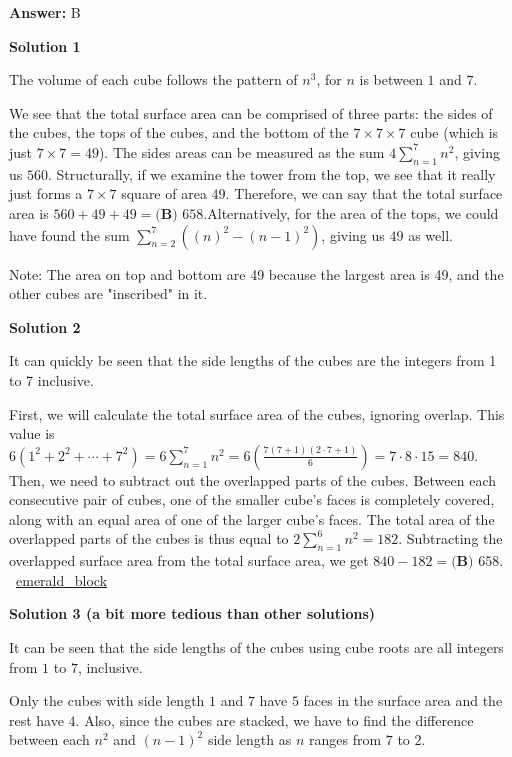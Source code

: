\begin{enumerate}
 \textbf{Answer: }B



\textbf{Solution 1}

The volume of each cube follows the pattern of $n^3$, for $n$ is between $1$ and $7$.

 We see that the total surface area can be comprised of three parts: the sides of the cubes, the tops of the cubes, and the bottom of the $7\times 7\times 7$ cube (which is just $7 \times 7 = 49$). The sides areas can be measured as the sum $4\sum_{n=1}^{7} n^2$, giving us $560$. Structurally, if we examine the tower from the top, we see that it really just forms a $7\times 7$ square of area $49$. Therefore, we can say that the total surface area is $560 + 49 + 49 = \boxed{\textbf{(B) }658}$.Alternatively, for the area of the tops, we could have found the sum $\sum_{n=2}^{7}((n)^{2}-(n-1)^{2})$, giving us $49$ as well.

 Note: The area on top and bottom are 49 because the largest area is 49, and the other cubes are "inscribed" in it.

 


 



\textbf{Solution 2}

It can quickly be seen that the side lengths of the cubes are the integers from 1 to 7 inclusive.

 First, we will calculate the total surface area of the cubes, ignoring overlap. This value is $6 ( 1^2 + 2^2 + \cdots + 7^2 ) = 6\sum_{n=1}^{7} n^2 = 6 \left( \frac{7(7 + 1)(2 \cdot 7 + 1)}{6} \right) = 7 \cdot 8 \cdot 15 = 840$. Then, we need to subtract out the overlapped parts of the cubes. Between each consecutive pair of cubes, one of the smaller cube's faces is completely covered, along with an equal area of one of the larger cube's faces. The total area of the overlapped parts of the cubes is thus equal to $2\sum_{n=1}^{6} n^2 = 182$. Subtracting the overlapped surface area from the total surface area, we get $840 - 182 = \boxed{\textbf{(B) }658}$. ~\href{https://artofproblemsolving.com/wiki/index.php?title=User:Emerald\_block}{emerald\_block}

 



\textbf{Solution 3 (a bit more tedious than other solutions)}

It can be seen that the side lengths of the cubes using cube roots are all integers from $1$ to $7$, inclusive.

 Only the cubes with side length $1$ and $7$ have $5$ faces in the surface area and the rest have $4$. Also, since the cubes are stacked, we have to find the difference between each $n^2$ and $(n-1)^2$ side length as $n$ ranges from $7$ to $2$. 


\end{enumerate}
